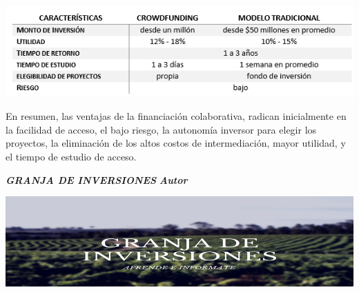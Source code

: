 \documentclass[
]{book}
\begin{document}
\begin{center}\includegraphics[width=1\linewidth]{imagenes/Tabla} \end{center}

En resumen, las ventajas de la financiación colaborativa, radican inicialmente en la facilidad de acceso, el bajo riesgo, la autonomía inversor para elegir los proyectos, la eliminación de los altos costos de intermediación, mayor utilidad, y el tiempo de estudio de acceso.

\textbf{\emph{GRANJA DE INVERSIONES}}
\textbf{\emph{Autor}}

\includegraphics[width=1\linewidth,height=0.3\textheight]{imagenes/Granja1}
\end{document}
